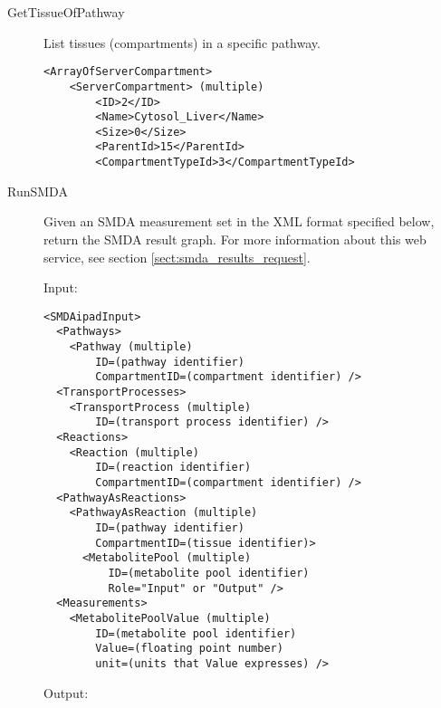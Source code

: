 \begin{description}
    \item[GetTissueOfPathway] List tissues (compartments) in a specific pathway.

    \begin{lstlisting}
<ArrayOfServerCompartment>
    <ServerCompartment> (multiple)
        <ID>2</ID>
        <Name>Cytosol_Liver</Name>
        <Size>0</Size>
        <ParentId>15</ParentId>
        <CompartmentTypeId>3</CompartmentTypeId>
    \end{lstlisting}

    \item[RunSMDA] Given an SMDA measurement set in the XML format specified
    below, return the SMDA result graph. For more information about this web
    service, see section \ref{sect:smda_results_request}.

    Input:

    \begin{lstlisting}
<SMDAipadInput>
  <Pathways>
    <Pathway (multiple)
        ID=(pathway identifier)
        CompartmentID=(compartment identifier) />
  <TransportProcesses>
    <TransportProcess (multiple)
        ID=(transport process identifier) />
  <Reactions>
    <Reaction (multiple)
        ID=(reaction identifier)
        CompartmentID=(compartment identifier) />
  <PathwayAsReactions>
    <PathwayAsReaction (multiple)
        ID=(pathway identifier)
        CompartmentID=(tissue identifier)>
      <MetabolitePool (multiple)
          ID=(metabolite pool identifier)
          Role="Input" or "Output" />
  <Measurements>
    <MetabolitePoolValue (multiple)
        ID=(metabolite pool identifier)
        Value=(floating point number)
        unit=(units that Value expresses) />
    \end{lstlisting}

    Output:


\end{description}
